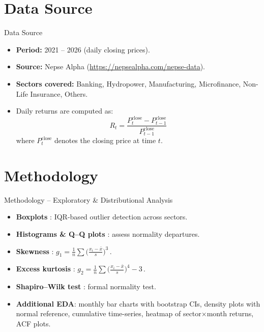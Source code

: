 \documentclass[10pt, aspectratio=169]{beamer}
\begin{document}
\section{Data Source}

\begin{frame}{Data Source}
\begin{itemize}
    \item \textbf{Period:} 2021 -- 2026 (daily closing prices).
    \item \textbf{Source:} Nepse Alpha (\url{https://nepsealpha.com/nepse-data}).
    \item \textbf{Sectors covered:} Banking, Hydropower, Manufacturing, Microfinance, Non-Life Insurance, Others.
    \item Daily returns are computed as:
    \[
    R_t = \frac{P_t^{\text{close}} - P_{t-1}^{\text{close}}}{P_{t-1}^{\text{close}}}
    \]
    where $P_t^{\text{close}}$ denotes the closing price at time $t$.
\end{itemize}
\end{frame}

\section{Methodology}

\begin{frame}{Methodology -- Exploratory \& Distributional Analysis}
\begin{itemize}
    \item \textbf{Boxplots} \cite{tukey1977eda}: IQR-based outlier detection across sectors.
    \item \textbf{Histograms \& Q--Q plots} \cite{chambers1983graphical}: assess normality departures.
    \item \textbf{Skewness} \cite{joanes1998comparing}: $g_1 = \frac{1}{n}\sum\!\bigl(\frac{x_i-\bar{x}}{s}\bigr)^{\!3}$\,.
    \item \textbf{Excess kurtosis} \cite{de1992tests}: $g_2 = \frac{1}{n}\sum\!\bigl(\frac{x_i-\bar{x}}{s}\bigr)^{\!4} - 3$\,.
    \item \textbf{Shapiro--Wilk test} \cite{shapiro1965variance}: formal normality test.
    \item \textbf{Additional EDA}: monthly bar charts with bootstrap CIs, density plots with normal reference, cumulative time-series, heatmap of sector$\times$month returns, ACF plots.
\end{itemize}
\end{frame}
\end{document}
